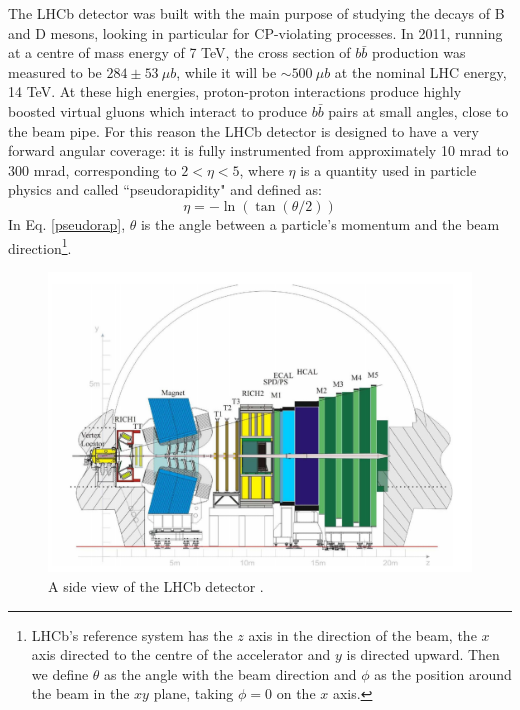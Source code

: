 The LHCb detector was built with the main purpose of studying the decays of B and D mesons, looking in particular for CP-violating processes. In 2011, running at a centre of mass energy of 7 TeV, the cross section of $b\bar{b}$ production was measured to be $284 \pm 53 ~\mu b$\cite{Aaij:2010gn}, while it will be $\sim500 ~\mu b$ at the nominal LHC energy, 14 TeV.
At these high energies, proton-proton interactions produce highly boosted virtual gluons which interact to produce $b\bar{b}$ pairs at small angles, close to the beam pipe. For this reason the LHCb detector is designed to have a very forward angular coverage: it is fully instrumented from approximately 10 mrad to 300 mrad, corresponding to $2 < \eta < 5$, where $\eta$ is a quantity used in particle physics and called ``pseudorapidity" and defined as:
\begin{equation}
\label{pseudorap}
\eta = - \ln(\tan(\theta/2))
\end{equation}
In Eq. \ref{pseudorap}, $\theta$ is the angle between a particle's momentum and the beam direction\footnote{LHCb's reference system has the $z$ axis in the direction of the beam, the $x$ axis directed to the centre of the accelerator and $y$ is directed upward. Then we define $\theta$ as the angle with the beam direction and $\phi$ as the position around the beam in the $xy$ plane, taking $\phi = 0$ on the $x$ axis.}.

\begin{figure}[h]
\label{lhcb}
\includegraphics[width=0.9\linewidth]{Detector/figs/LHCb_official.png}
\caption{A side view of the LHCb detector \cite{Alves:2008zz}.}
\end{figure}

